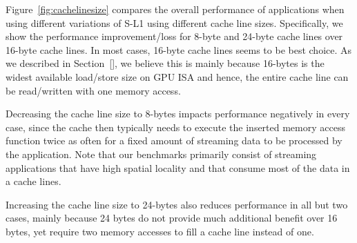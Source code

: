 Figure~\ref{fig:cachelinesize} compares the overall performance of applications when using different variations of S-L1 using different cache line sizes. 
Specifically, we show the performance improvement/loss for 8-byte and 24-byte cache lines over 16-byte cache lines.
In most cases, 16-byte cache lines seems to be best choice. 
As we described in Section~\ref{}, we believe this is mainly because 16-bytes is the widest available load/store size on GPU ISA and hence, the entire cache line can be read/written with one memory access.

Decreasing the cache line size to 8-bytes impacts performance negatively in every case, since the cache then typically needs to execute the inserted memory access function twice as often for a fixed amount of streaming data to be processed by the application. 
Note that our benchmarks primarily consist of streaming applications that have high spatial locality and that consume most of the data in a cache lines.

Increasing the cache line size to 24-bytes also reduces performance in all but two cases, mainly
because 24 bytes do not provide much additional benefit over 16 bytes, yet require two memory accesses to fill a cache line instead of one.




